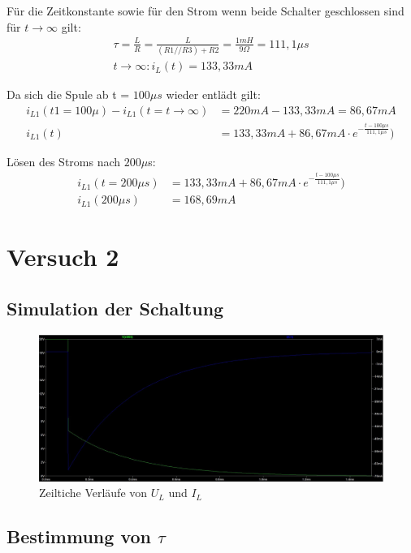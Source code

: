 \documentclass{article}
\begin{document}
Für die Zeitkonstante sowie für den Strom wenn beide Schalter geschlossen sind für $t \rightarrow \infty$ gilt:
\begin{align*}
  \tau = \frac{L}{R} = \frac{L}{(R1//R3)+R2} = \frac{1mH}{9\Omega} = 111,1\mu s\\
  t\rightarrow\infty : i_L(t) = 133,33mA
\end{align*}

Da sich die Spule ab t = $100\mu s$ wieder entlädt gilt:
\begin{align*}
  i_{L1}(t1=100\mu) - i_{L1}(t=t\rightarrow \infty) &= 220mA - 133,33mA = 86,67mA\\
  i_{L1}(t) &= 133,33mA + 86,67mA\cdot e^{-\frac{t-100\mu s}{111,1\mu s}})
\end{align*}


Lösen des Stroms nach $200\mu$s:
\begin{align*}
  i_{L1}(t=200\mu s) &= 133,33mA + 86,67mA\cdot e^{-\frac{t-100\mu s}{111,1\mu s}})\\
  i_{L1}(200\mu s) &= 168,69mA
\end{align*}

\newpage
\section{Versuch 2}
\subsection{Simulation der Schaltung}
\begin{figure}[h]
  \begin{center}
    \includegraphics[scale=0.4]{../assets/images/ET2P5/aufgabe 2 u von t und i von t.JPG}
    \caption{Zeiltiche Verläufe von $U_L$ und $I_L$}
  \end{center}
\end{figure}

\subsection{Bestimmung von $\tau$}
\end{document}
